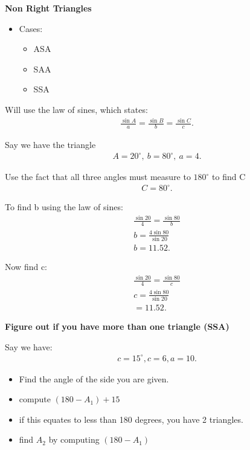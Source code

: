 \documentclass{report}
\begin{document}
  \bigbreak \noindent \bigbreak \noindent
  \begin{large}
    \textbf{Non Right Triangles}
  \end{large}
  \begin{itemize}
    \item Cases:
      \begin{itemize}
        \item ASA
        \item SAA
        \item SSA
      \end{itemize}
  \end{itemize}
  Will use the law of sines, which states:
  \begin{align*}
    \frac{\sin{A}}{a} = \frac{\sin{B}}{b} = \frac{\sin{C}}{c}
  .\end{align*}

  \bigbreak \noindent \bigbreak \noindent
  Say we have the triangle
  \begin{align*}
    A=20^{\circ},\ b=80^{\circ},\ a=4
  .\end{align*}
  \begin{figure}[ht]
    \centering
    \label{fig:tri2}
  \end{figure}

  \bigbreak \noindent \bigbreak \noindent
  Use the fact that all three angles must measure to $180^{\circ}$ to find C
  \begin{align*}
    C=80^{\circ}
  .\end{align*}

  \bigbreak \noindent \bigbreak \noindent
  To find b using the law of sines:
  \begin{align*}
    \frac{\sin{20}}{4} = \frac{\sin{80}}{b} \\
    b = \frac{4\sin{80}}{\sin{20}} \\
    b = 11.52
  .\end{align*}

  \bigbreak \noindent \bigbreak \noindent
  Now find c:
  \begin{align*}
    \frac{\sin{20}}{4} = \frac{\sin{80}}{c} \\
    c = \frac{4\sin{80}}{\sin{20}} \\
    = 11.52
  .\end{align*}

  \bigbreak \noindent \bigbreak \noindent 
  \begin{large}
    \textbf{Figure out if you have more than one triangle (SSA)}
  \end{large}
  \bigbreak \noindent \bigbreak \noindent
  Say we have:
  \begin{align*}
    c = 15^{\circ}, c=6, a=10
  .\end{align*}
  \begin{itemize}
    \item Find the angle of the side you are given.
    \item compute $(180-A_{1}) + 15$
    \item if this equates to less than 180 degrees, you have 2 triangles.
    \item find $A_{2}$ by computing $(180-A_{1}) $
  \end{itemize}
\end{document}
